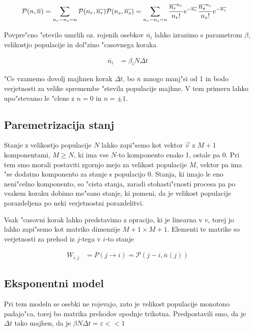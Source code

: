 \documentclass[a4paper,10pt]{article}
\newcommand{\eps}{\varepsilon}
\begin{document}
\begin{align}
\mathcal P(n, \overline n) &= \sum_{n_r - n_s = n}\mathcal{P}(n_r, \overline{n_r})\mathcal{P}(n_s, \overline{n_s}) = \sum_{n_r - n_s = n}\frac{\overline{n_r}^{n_r}}{n_r!} e^{-\overline{n_r}}\frac{\overline{n_s}^{n_s}}{n_s!} e^{-\overline{n_s}}  
\end{align}

Povpre"cno "stevilo umrlih oz. rojenih osebkov $\overline{n_i}$ lahko izrazimo s parametrom $\beta$, velikostjo populacije in dol"zino "casovnega koraka

\begin{align}
  \overline{n_i} &= \beta_i N \Delta t
\end{align}

"Ce vzamemo dovolj majhnen korak $\Delta t$, bo $\overline{n}$ mnogo manj"si od 1 in bodo verjetnosti za velike spremembe "stevila populacije majhne. V tem primeru lahko upo"stevamo le "clene z $n=0$ in $n = \pm 1$. 

\subsection{Paremetrizacija stanj}

Stanje z velikostjo populacije $N$ lahko zapi"semo kot vektor $\vec v$ z $M+1$ komponentami, $M \geq N$, ki ima vse $N$-to komponento enako 1, ostale pa 0. Pri tem smo morali postaviti zgornjo mejo za velikost populacije $M$, vektor pa ima "se dodatno komponento za stanje s populacijo 0. Stanja, ki imajo le eno neni"celno komponento, so "cista stanja, zaradi stohasti"cnosti procesa pa po vsakem koraku dobimo me"sano stanje, ki pomeni, da je velikost populacije porazdeljena po neki verjetnostni porazdelitvi. 

Vsak "casovni korak lahko predstavimo z opracijo, ki je linearna v $v$, torej jo lahko zapi"semo kot matriko dimenzije $M+1\times M+1$. Elementi te matrike so verjetnosti za prehod iz $j$-tega v $i$-to stanje

\begin{align}
W_{i,j} &= P(j\to i) = \mathcal P(j-i, \overline{n}(j))
\end{align}

\subsection{Eksponentni model}

Pri tem modelu se osebki ne rojevajo, zato je velikost populacije monotono padajo"ca, torej bo matrika prehodov spodnje trikotna. Predpostavili smo, da je $\Delta t$ tako majhen, da je $\beta N \Delta t = \eps << 1$
\end{document}
